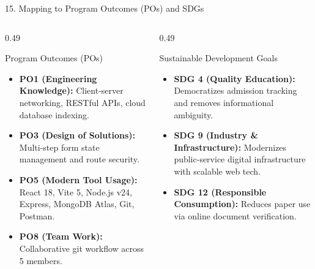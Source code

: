\documentclass[aspectratio=169, 10pt]{beamer}
\begin{document}
\begin{frame}{15. Mapping to Program Outcomes (POs) and SDGs}
  \footnotesize
  \begin{columns}[T,onlytextwidth]
    \begin{column}{0.49\textwidth}
      \begin{block}{Program Outcomes (POs)}
        \begin{itemize}
          \item \textbf{PO1 (Engineering Knowledge):} Client-server networking, RESTful APIs, cloud database indexing.
          \item \textbf{PO3 (Design of Solutions):} Multi-step form state management and route security.
          \item \textbf{PO5 (Modern Tool Usage):} React 18, Vite 5, Node.js v24, Express, MongoDB Atlas, Git, Postman.
          \item \textbf{PO8 (Team Work):} Collaborative git workflow across 5 members.
        \end{itemize}
      \end{block}
    \end{column}
    \begin{column}{0.49\textwidth}
      \begin{block}{Sustainable Development Goals}
        \begin{itemize}
          \item \textbf{SDG 4 (Quality Education):} Democratizes admission tracking and removes informational ambiguity.
          \item \textbf{SDG 9 (Industry \& Infrastructure):} Modernizes public-service digital infrastructure with scalable web tech.
          \item \textbf{SDG 12 (Responsible Consumption):} Reduces paper use via online document verification.
        \end{itemize}
      \end{block}
    \end{column}
  \end{columns}
\end{frame}
\end{document}
